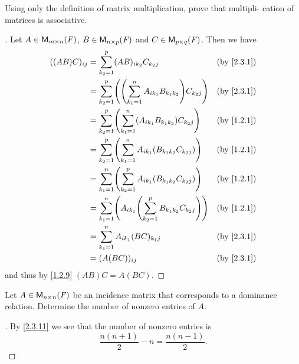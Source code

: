 \begin{ex}\label{ex:2.3.18}
  Using only the definition of matrix multiplication, prove that multipli- cation of matrices is associative.
\end{ex}

\begin{proof}[]
  Let \(A \in \ms\), \(B \in \ms[n][p][\F]\) and \(C \in \ms[p][q][\F]\).
  Then we have
  \begin{align*}
    ((AB) C)_{i j} & = \sum_{k_2 = 1}^p (AB)_{i k_2} C_{k_2 j}                                     &  & \by{2.3.1} \\
                   & = \sum_{k_2 = 1}^p \pa{\pa{\sum_{k_1 = 1}^n A_{i k_1} B_{k_1 k_2}} C_{k_2 j}} &  & \by{2.3.1} \\
                   & = \sum_{k_2 = 1}^p \pa{\sum_{k_1 = 1}^n (A_{i k_1} B_{k_1 k_2}) C_{k_2 j}}    &  & \by{1.2.1} \\
                   & = \sum_{k_2 = 1}^p \pa{\sum_{k_1 = 1}^n A_{i k_1} (B_{k_1 k_2} C_{k_2 j})}    &  & \by{1.2.1} \\
                   & = \sum_{k_1 = 1}^n \pa{\sum_{k_2 = 1}^p A_{i k_1} (B_{k_1 k_2} C_{k_2 j})}    &  & \by{1.2.1} \\
                   & = \sum_{k_1 = 1}^n \pa{A_{i k_1} \pa{\sum_{k_2 = 1}^p B_{k_1 k_2} C_{k_2 j}}} &  & \by{1.2.1} \\
                   & = \sum_{k_1 = 1}^n A_{i k_1} (BC)_{k_1 j}                                     &  & \by{2.3.1} \\
                   & = (A (BC))_{i j}                                                              &  & \by{2.3.1}
  \end{align*}
  and thus by \cref{1.2.9} \((AB) C = A (BC)\).
\end{proof}

\setcounter{ex}{22}
\begin{ex}\label{ex:2.3.23}
  Let \(A \in \ms[n][n][\F]\) be an incidence matrix that corresponds to a dominance relation.
  Determine the number of nonzero entries of \(A\).
\end{ex}

\begin{proof}[]
  By \cref{2.3.11} we see that the number of nonzero entries is
  \[
    \frac{n (n + 1)}{2} - n = \frac{n (n - 1)}{2}.
  \]
\end{proof}
